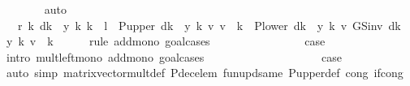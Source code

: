 \begin{isabellebody}
\ \ \ \ \ \ \isamarkupfalse%
\ auto\isanewline
\ \ \ \ \isamarkupfalse%
\ \isamarkupfalse%
\ {\isachardoublequoteopen}{\isasymdots}\ {\isasymle}\ r\ {\isacharparenleft}{\kern0pt}k{\isacharcomma}{\kern0pt}\ {\isacharparenleft}{\kern0pt}d{\isacharparenleft}{\kern0pt}k\ {\isacharcolon}{\kern0pt}{\isacharequal}{\kern0pt}\ y\ k{\isacharparenright}{\kern0pt}{\isacharparenright}{\kern0pt}\ k{\isacharparenright}{\kern0pt}\ {\isacharplus}{\kern0pt}\ l\ {\isacharasterisk}{\kern0pt}\ {\isacharparenleft}{\kern0pt}{\isacharparenleft}{\kern0pt}P{\isacharunderscore}{\kern0pt}upper\ {\isacharparenleft}{\kern0pt}d{\isacharparenleft}{\kern0pt}k\ {\isacharcolon}{\kern0pt}{\isacharequal}{\kern0pt}\ y\ k{\isacharparenright}{\kern0pt}{\isacharparenright}{\kern0pt}\ {\isacharasterisk}{\kern0pt}v\ v{\isacharparenright}{\kern0pt}\ {\isachardollar}{\kern0pt}\ k\ {\isacharplus}{\kern0pt}\ {\isacharparenleft}{\kern0pt}P{\isacharunderscore}{\kern0pt}lower\ {\isacharparenleft}{\kern0pt}d{\isacharparenleft}{\kern0pt}k\ {\isacharcolon}{\kern0pt}{\isacharequal}{\kern0pt}\ y\ k{\isacharparenright}{\kern0pt}{\isacharparenright}{\kern0pt}\ {\isacharasterisk}{\kern0pt}v\ GS{\isacharunderscore}{\kern0pt}inv\ {\isacharparenleft}{\kern0pt}d{\isacharparenleft}{\kern0pt}k\ {\isacharcolon}{\kern0pt}{\isacharequal}{\kern0pt}\ y\ k{\isacharparenright}{\kern0pt}{\isacharparenright}{\kern0pt}\ v{\isacharparenright}{\kern0pt}\ {\isachardollar}{\kern0pt}\ k{\isacharparenright}{\kern0pt}{\isachardoublequoteclose}\isanewline
\ \ \ \ \isamarkupfalse%
\ {\isacharparenleft}{\kern0pt}rule\ add{\isacharunderscore}{\kern0pt}mono{\isacharcomma}{\kern0pt}\ goal{\isacharunderscore}{\kern0pt}cases{\isacharparenright}{\kern0pt}\isanewline
\ \ \ \ \ \ \isamarkupfalse%
\ {}\isanewline
\ \ \ \ \ \ \isamarkupfalse%
\ {\isacharquery}{\kern0pt}case\isanewline
\ \ \ \ \ \ \isamarkupfalse%
\ {\isacharparenleft}{\kern0pt}intro\ mult{\isacharunderscore}{\kern0pt}left{\isacharunderscore}{\kern0pt}mono\ add{\isacharunderscore}{\kern0pt}mono{\isacharcomma}{\kern0pt}\ goal{\isacharunderscore}{\kern0pt}cases{\isacharparenright}{\kern0pt}\isanewline
\ \ \ \ \ \ \ \ \isamarkupfalse%
\ {}\isanewline
\ \ \ \ \ \ \ \ \isamarkupfalse%
\ {\isacharquery}{\kern0pt}case\isanewline
\ \ \ \ \ \ \ \ \ \ \isamarkupfalse%
\ {\isacharparenleft}{\kern0pt}auto\ simp{\isacharcolon}{\kern0pt}\ matrix{\isacharunderscore}{\kern0pt}vector{\isacharunderscore}{\kern0pt}mult{\isacharunderscore}{\kern0pt}def\ P{\isacharunderscore}{\kern0pt}dec{\isacharunderscore}{\kern0pt}elem\ fun{\isacharunderscore}{\kern0pt}upd{\isacharunderscore}{\kern0pt}same\ P{\isacharunderscore}{\kern0pt}upper{\isacharunderscore}{\kern0pt}def\ cong{\isacharcolon}{\kern0pt}\ if{\isacharunderscore}{\kern0pt}cong{\isacharparenright}{\kern0pt}\isanewline

\end{isabellebody}
